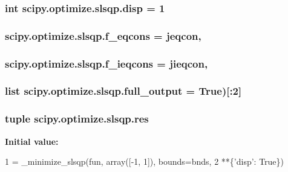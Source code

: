 \subsubsection[{disp}]{\setlength{\rightskip}{0pt plus 5cm}int scipy.\+optimize.\+slsqp.\+disp = 1}\label{namespacescipy_1_1optimize_1_1slsqp_a03befd427a784ed4840724d1b667f45a}
\hypertarget{namespacescipy_1_1optimize_1_1slsqp_a23ed43f3b7dfd7741e76077a310c9422}{}
\subsubsection[{f\+\_\+eqcons}]{\setlength{\rightskip}{0pt plus 5cm}scipy.\+optimize.\+slsqp.\+f\+\_\+eqcons = {\bf jeqcon},}\label{namespacescipy_1_1optimize_1_1slsqp_a23ed43f3b7dfd7741e76077a310c9422}
\hypertarget{namespacescipy_1_1optimize_1_1slsqp_a8bc529ad14da55295d2cf2d17addd929}{}
\subsubsection[{f\+\_\+ieqcons}]{\setlength{\rightskip}{0pt plus 5cm}scipy.\+optimize.\+slsqp.\+f\+\_\+ieqcons = {\bf jieqcon},}\label{namespacescipy_1_1optimize_1_1slsqp_a8bc529ad14da55295d2cf2d17addd929}
\hypertarget{namespacescipy_1_1optimize_1_1slsqp_a456ebd8eb673f37e76bf847157afc98c}{}
\subsubsection[{full\+\_\+output}]{\setlength{\rightskip}{0pt plus 5cm}list scipy.\+optimize.\+slsqp.\+full\+\_\+output = {\bf True})\mbox{[}\+:2\mbox{]}}\label{namespacescipy_1_1optimize_1_1slsqp_a456ebd8eb673f37e76bf847157afc98c}
\hypertarget{namespacescipy_1_1optimize_1_1slsqp_ae506e7b125d0eeec39748e2de3d29a26}{}
\subsubsection[{res}]{\setlength{\rightskip}{0pt plus 5cm}tuple scipy.\+optimize.\+slsqp.\+res}\label{namespacescipy_1_1optimize_1_1slsqp_ae506e7b125d0eeec39748e2de3d29a26}
{\bfseries Initial value\+:}
\begin{DoxyCode}
1 = \_minimize\_slsqp(fun, array([-1, 1]), bounds=bnds,
2                           **\{\textcolor{stringliteral}{'disp'}: \textcolor{keyword}{True}\})
\end{DoxyCode}
